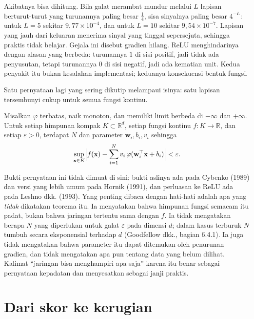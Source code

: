Akibatnya bisa dihitung. Bila galat merambat mundur melalui $L$ lapisan berturut-turut yang
turunannya paling besar $\tfrac14$, sisa sinyalnya paling besar $4^{-L}$: untuk $L=5$ sekitar
$9{,}77\times10^{-4}$, dan untuk $L=10$ sekitar $9{,}54\times10^{-7}$. Lapisan yang jauh dari
keluaran menerima sinyal yang tinggal sepersejuta, sehingga praktis tidak belajar. Gejala ini
disebut gradien hilang. ReLU menghindarinya dengan alasan yang berbeda: turunannya $1$ di sisi
positif, jadi tidak ada penyusutan, tetapi turunannya $0$ di sisi negatif, jadi ada
kematian unit. Kedua penyakit itu bukan kesalahan implementasi; keduanya konsekuensi bentuk
fungsi.

Satu pernyataan lagi yang sering dikutip melampaui isinya: satu lapisan tersembunyi cukup untuk semua fungsi kontinu.

\begin{teorema}
Misalkan $\varphi$ terbatas, naik monoton, dan memiliki limit berbeda di $-\infty$ dan
$+\infty$. Untuk setiap himpunan kompak $K\subset\mathbb{R}^{d}$, setiap fungsi kontinu
$f:K\to\mathbb{R}$, dan setiap $\varepsilon>0$, terdapat $N$ dan parameter
$\mathbf{w}_{i},b_{i},v_{i}$ sehingga
\[
  \sup_{\mathbf{x}\in K}\Bigl|f(\mathbf{x})-\sum_{i=1}^{N}v_{i}\,
  \varphi(\mathbf{w}_{i}^{\top}\mathbf{x}+b_{i})\Bigr|<\varepsilon .
\]
\end{teorema}

Bukti pernyataan ini tidak dimuat di sini; bukti aslinya ada pada Cybenko (1989) dan
versi yang lebih umum pada Hornik (1991), dan perluasan ke ReLU ada pada Leshno dkk. (1993).
Yang penting dibaca dengan hati-hati adalah apa yang \emph{tidak} dikatakan teorema itu. Ia
menyatakan bahwa himpunan fungsi semacam itu padat, bukan bahwa jaringan tertentu sama
dengan $f$. Ia tidak mengatakan berapa $N$ yang diperlukan untuk galat $\varepsilon$ pada dimensi $d$; dalam kasus terburuk $N$ tumbuh secara eksponensial terhadap $d$ (Goodfellow dkk., bagian 6.4.1). Ia juga tidak mengatakan bahwa parameter itu dapat ditemukan oleh penurunan gradien, dan tidak mengatakan apa pun tentang data yang belum dilihat.
Kalimat ``jaringan bisa menghampiri apa saja'' karena itu benar sebagai pernyataan
kepadatan dan menyesatkan sebagai janji praktis.

\section{Dari skor ke kerugian}

